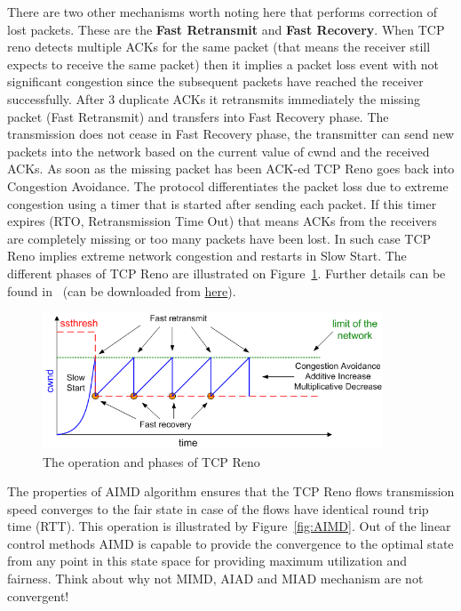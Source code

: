 \documentclass[a4paper]{article}
\begin{document}
There are two other mechanisms worth noting here that performs correction of lost packets. These are the \textbf{Fast
    Retransmit} and \textbf{Fast Recovery}. When TCP reno detects multiple ACKs for the same packet (that means the
receiver still expects to receive the same packet) then it implies a packet loss event with not significant congestion
since the subsequent packets have reached the receiver successfully. After 3 duplicate ACKs it retransmits immediately
the missing packet (Fast Retransmit) and transfers into Fast Recovery phase. The transmission does not cease in Fast
Recovery phase, the transmitter can send new packets into the network based on the current value of cwnd and the
received ACKs. As soon as the missing packet has been ACK-ed TCP Reno goes back into Congestion Avoidance. The protocol
differentiates the packet loss due to extreme congestion using a timer that is started after sending each packet. If
this timer expires (RTO, Retransmission Time Out) that means ACKs from the receivers are completely missing or too many
packets have been lost. In such case TCP Reno implies extreme network congestion and restarts in Slow Start. The
different phases of TCP Reno are illustrated on Figure~\ref{fig:TCP-Reno-operation}. Further details can be found
in~\cite{CongestionAvoidance} (can be downloaded from
\href{http://qosip.tmit.bme.hu/cgi-bin/twiki/viewfile/VITT5318/WebHome?rev=1;filename=jacobson88congestion.pdf}{here}).

\begin{figure}[H]
    \centering
    \includegraphics[width=0.9\textwidth]{figures/tcp-reno.png}
    \caption{The operation and phases of TCP Reno}
    \label{fig:TCP-Reno-operation}
\end{figure}

The properties of AIMD algorithm ensures that the TCP Reno flows transmission speed converges to the fair state in case
of the flows have identical round trip time (RTT). This operation is illustrated by Figure~\ref{fig:AIMD}. Out of the
linear control methods AIMD is capable to provide the convergence to the optimal state from any point in this state
space for providing maximum utilization and fairness. Think about why not MIMD, AIAD and MIAD mechanism are not
convergent!
\end{document}
